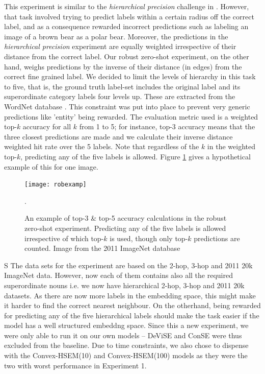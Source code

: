 \documentclass[12pt]{report}
\begin{document}
This experiment is similar to the \textit{hierarchical precision} challenge in \cite{Frome2013}. However, that task involved trying to predict labels within a certain radius off the correct label, and as a consequence rewarded incorrect predictions such as labeling an image of a brown bear as a polar bear. Moreover, the predictions in the \textit{hierarchical precision} experiment are equally weighted irrespective of their distance from the correct label. Our robust zero-shot experiment, on the other hand, weighs predictions by the inverse of their distance (in edges) from the correct fine grained label. We decided to limit the levels of hierarchy in this task to five, that is, the ground truth label-set includes the original label and its superordinate category labels four levels up. These are extracted from the WordNet database \cite{Miller1995}. This constraint was put into place to prevent very generic predictions like 'entity' being rewarded. The evaluation metric used is a weighted top-$k$ accuracy for all $k$ from 1 to 5; for instance,  top-$3$ accuracy means that the three closest predictions are made and we calculate their inverse distance weighted hit rate over the 5 labels. Note that regardless of the $k$ in the weighted top-$k$, predicting any of the five labels is allowed. Figure \ref{fig:robexp} gives a hypothetical example of this for one image. 
\begin{figure}
  \centering
  \texttt{[image: robexamp]}
  \caption{An example of top-3 \& top-5 accuracy calculations in the robust zero-shot experiment. Predicting any of the five labels is allowed irrespective of which top-$k$ is used, though only top-$k$ predictions are counted. Image from the 2011 ImageNet database \cite{JiaDeng2009}}.
  \label{fig:robexp}
\end{figure}
S
The data sets for the experiment are based on the 2-hop, 3-hop and 2011 20k ImageNet data. However, now each of them contains also all the required superordinate nouns i.e. we now have hierarchical 2-hop, 3-hop and 2011 20k datasets. As there are now more labels in the embedding space, this might make it harder to find the correct nearest neighbour. On the otherhand, being rewarded for predicting any of the five hierarchical labels should make the task easier if the model has a well structured embeddng space. Since this a new experiment, we were only able to run it on our own models -- DeViSE and ConSE were thus excluded from the baseline. Due to time constraints, we also chose to dispense with the Convex-HSEM(10) and Convex-HSEM(100) models as they were the two with worst performance in Experiment 1. 
\end{document}
